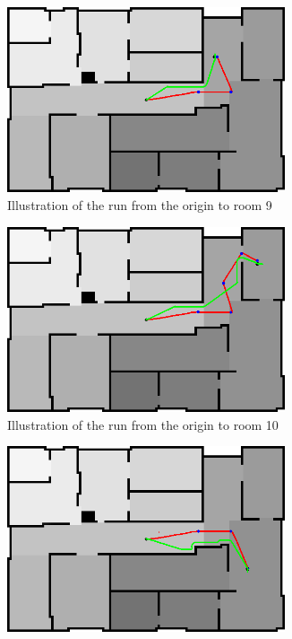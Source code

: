 \documentclass[../Head/Main.tex]{subfiles}
\begin{document}
\begin{figure}[H]
  \begin{subfigure}[b]{0.49\textwidth}
    \centering
    \includegraphics[width=0.9\textwidth]{brushfireAndBugTest9}
    \caption{Illustration of the run from the origin to room 9}
    \label{fig:Test9}
  \end{subfigure}
  \hfill
  \begin{subfigure}[b]{0.49\textwidth}
    \centering
    \includegraphics[width=0.9\textwidth]{brushfireAndBugTest10}
    \caption{Illustration of the run from the origin to room 10}
    \label{fig:Test10}
  \end{subfigure}
  \hfill
  \begin{subfigure}[b]{0.49\textwidth}
    \centering
    \includegraphics[width=0.9\textwidth]{brushfireAndBugTest11}

\end{subfigure}
\end{figure}
\end{document}

